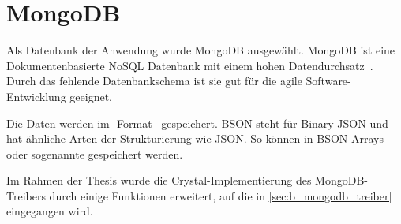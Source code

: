 \section{MongoDB}
\label{sec:g_mongodb}

Als Datenbank der Anwendung wurde MongoDB ausgewählt.  MongoDB ist eine
Dokumentenbasierte NoSQL Datenbank mit einem hohen Datendurchsatz~\cite{mongo}.
Durch das fehlende Datenbankschema ist sie gut für die agile
Software-Entwicklung geeignet.

Die Daten werden im -Format~\cite{bson} gespeichert.  BSON steht
für Binary JSON und hat ähnliche Arten der Strukturierung wie JSON.  So können
in BSON Arrays oder sogenannte  gespeichert werden.

Im Rahmen der Thesis wurde die Crystal-Implementierung des MongoDB-Treibers
durch einige Funktionen erweitert, auf die in \cref{sec:b_mongodb_treiber}
eingegangen wird.
